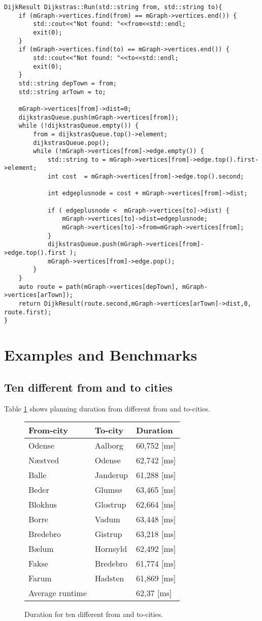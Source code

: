 \begin{lstlisting}
DijkResult Dijkstras::Run(std::string from, std::string to){
	if (mGraph->vertices.find(from) == mGraph->vertices.end()) {
		std::cout<<"Not found: "<<from<<std::endl;
		exit(0);
	}
	if (mGraph->vertices.find(to) == mGraph->vertices.end()) {
		std::cout<<"Not found: "<<to<<std::endl;
		exit(0);
	}
	std::string depTown = from;
	std::string arTown = to;

	mGraph->vertices[from]->dist=0;
	dijkstrasQueue.push(mGraph->vertices[from]);
	while (!dijkstrasQueue.empty()) {
		from = dijkstrasQueue.top()->element;
		dijkstrasQueue.pop();
		while (!mGraph->vertices[from]->edge.empty()) {
			std::string to = mGraph->vertices[from]->edge.top().first->element;
			int cost  = mGraph->vertices[from]->edge.top().second;

			int edgeplusnode = cost + mGraph->vertices[from]->dist;

			if ( edgeplusnode <  mGraph->vertices[to]->dist) {
				mGraph->vertices[to]->dist=edgeplusnode;
				mGraph->vertices[to]->from=mGraph->vertices[from];
			}
			dijkstrasQueue.push(mGraph->vertices[from]->edge.top().first );
			mGraph->vertices[from]->edge.pop();
		}
	}
	auto route = path(mGraph->vertices[depTown], mGraph->vertices[arTown]);
	return DijkResult(route.second,mGraph->vertices[arTown]->dist,0, route.first);
}
\end{lstlisting}

\section{Examples and Benchmarks}
\subsection{Ten different from and to cities}
Table \ref{tb:fromtoten} shows planning duration from different from and to-cities.

\begin{figure}[th!]
\centering
\begin{tabular}{l|l|l}
From-city & To-city & Duration \\\hline
Odense & Aalborg & 60,752 [ms] \\
Næstved & Odense & 62,742 [ms] \\
Balle & Janderup & 61,288 [ms] \\
Beder & Glumsø & 63,465 [ms] \\
Blokhus & Glostrup & 62,664 [ms] \\
Borre & Vadum & 63,448 [ms] \\
Bredebro & Gistrup & 63,218 [ms] \\
Bælum & Hornsyld & 62,492 [ms] \\
Fakse & Bredebro & 61,774 [ms] \\
Farum & Hadsten & 61,869 [ms] \\\hline
Average runtime && 62,37 [ms]
\end{tabular}
\captionsetup{type=table}
\caption[tekst i indholdsfortegnelsen]{Duration for ten different from and to-cities.}
\label{tb:fromtoten}
\end{figure}



